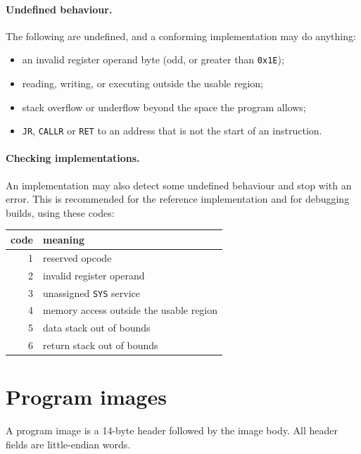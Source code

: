 \documentclass[11pt,a4paper]{article}
\newcommand{\op}[1]{\texttt{#1}}
\newcommand{\hx}[1]{\texttt{0x#1}}
\begin{document}
\paragraph{Undefined behaviour.} The following are undefined, and a
conforming implementation may do anything:
\begin{itemize}[nosep]
\item an invalid register operand byte (odd, or greater than \hx{1E});
\item reading, writing, or executing outside the usable region;
\item stack overflow or underflow beyond the space the program allows;
\item \op{JR}, \op{CALLR} or \op{RET} to an address that is not the start of an
  instruction.
\end{itemize}

\paragraph{Checking implementations.} An implementation may also detect
some undefined behaviour and stop with an error. This is recommended for the
reference implementation and for debugging builds, using these codes:

\begin{center}
\small
\begin{tabular}{@{}r l@{}}
\toprule
code & meaning\\
\midrule
1 & reserved opcode\\
2 & invalid register operand\\
3 & unassigned \op{SYS} service\\
4 & memory access outside the usable region\\
5 & data stack out of bounds\\
6 & return stack out of bounds\\
\bottomrule
\end{tabular}
\end{center}

\section{Program images}\label{sec:image}

A program image is a 14-byte header followed by the image body. All header
fields are little-endian words.
\end{document}
